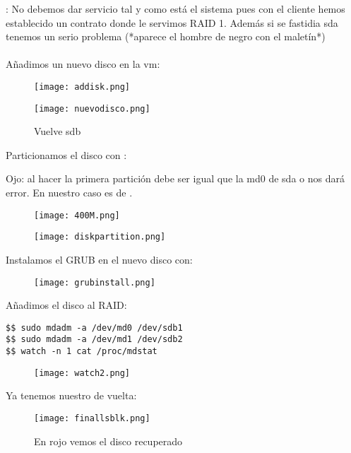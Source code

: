 : No debemos dar servicio tal y como está el sistema pues con el cliente hemos establecido un contrato donde le servimos RAID 1. Además si se fastidia sda tenemos un serio problema (*aparece el hombre de negro con el maletín*)
\\ \\
Añadimos un nuevo disco en la vm:
\begin{figure}[H]
	\centering
	\texttt{[image: addisk.png]}
\end{figure}
\begin{figure}[H]
	\centering
	\texttt{[image: nuevodisco.png]}
	\caption{Vuelve sdb}
\end{figure}

Particionamos el disco con :

Ojo: al hacer la primera partición debe ser igual que la md0 de sda o nos dará error. En nuestro caso es de .
\begin{figure}[H]
	\centering
	\texttt{[image: 400M.png]}
\end{figure}
\begin{figure}[H]
	\centering
	\texttt{[image: diskpartition.png]}
\end{figure}

Instalamos el GRUB en el nuevo disco con: 
\begin{figure}[H]
	\centering
	\texttt{[image: grubinstall.png]}
\end{figure}

Añadimos el disco al RAID:
\begin{verbatim}
$$ sudo mdadm -a /dev/md0 /dev/sdb1
$$ sudo mdadm -a /dev/md1 /dev/sdb2
$$ watch -n 1 cat /proc/mdstat
\end{verbatim}

\begin{figure}[H]
	\centering
	\texttt{[image: watch2.png]}
\end{figure}
Ya tenemos nuestro  de vuelta:

\begin{figure}[H]
	\centering
	\texttt{[image: finallsblk.png]}
	\caption{En rojo vemos el disco recuperado}
\end{figure}

